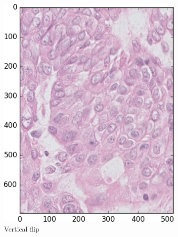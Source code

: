 \documentclass[a4paper,10pt]{article}
\begin{document}
\begin{figure}
\begin{multicols}{3}
    \begin{subfigure}{0.33\textwidth}
    \includegraphics[width=\linewidth]{flip.png}\par 
     \caption{Vertical flip}
     \label{fig:flip}
	\end{subfigure}%
	\begin{subfigure}{0.33\textwidth}

\end{subfigure}
\end{multicols}
\end{figure}
\end{document}
